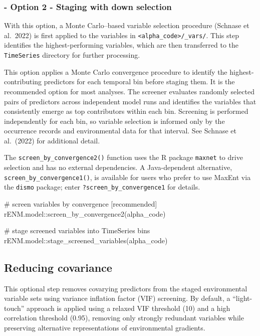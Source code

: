 \documentclass[
  letterpaper,
  DIV=11,
  numbers=noendperiod]{scrartcl}
\newenvironment{Shaded}{\begin{snugshade}}{\end{snugshade}}
\newcommand{\CommentTok}[1]{\textcolor[rgb]{0.37,0.37,0.37}{#1}}
\newcommand{\FunctionTok}[1]{\textcolor[rgb]{0.28,0.35,0.67}{#1}}
\newcommand{\NormalTok}[1]{\textcolor[rgb]{0.00,0.23,0.31}{#1}}
\newcommand{\SpecialCharTok}[1]{\textcolor[rgb]{0.37,0.37,0.37}{#1}}
\begin{document}
\subsubsection{- Option 2 - Staging with down
selection}\label{option-2---staging-with-down-selection}

With this option, a Monte Carlo--based variable selection procedure
(Schnase et al.~2022) is first applied to the variables in
\texttt{\textless{}alpha\_code\textgreater{}/\_vars/}. This step
identifies the highest-performing variables, which are then transferred
to the \texttt{TimeSeries} directory for further processing.

This option applies a Monte Carlo convergence procedure to identify the
highest-contributing predictors for each temporal bin before staging
them. It is the recommended option for most analyses. The screener
evaluates randomly selected pairs of predictors across independent model
runs and identifies the variables that consistently emerge as top
contributors within each bin. Screening is performed independently for
each bin, so variable selection is informed only by the occurrence
records and environmental data for that interval. See Schnase et
al.~(2022) for additional detail.

The \texttt{screen\_by\_convergence2()} function uses the R package
\texttt{maxnet} to drive selection and has no external dependencies. A
Java-dependent alternative, \texttt{screen\_by\_convergence1()}, is
available for users who prefer to use MaxEnt via the \texttt{dismo}
package; enter \texttt{?screen\_by\_convergence1} for details.

\begin{Shaded}
\begin{Highlighting}[]
\CommentTok{\# screen variables by convergence [recommended]}
\NormalTok{rENM.model}\SpecialCharTok{::}\FunctionTok{screen\_by\_convergence2}\NormalTok{(alpha\_code)}

\CommentTok{\# stage screened variables into TimeSeries bins}
\NormalTok{rENM.model}\SpecialCharTok{::}\FunctionTok{stage\_screened\_variables}\NormalTok{(alpha\_code)}
\end{Highlighting}
\end{Shaded}

\subsection{Reducing covariance}\label{reducing-covariance}

This optional step removes covarying predictors from the staged
environmental variable sets using variance inflation factor (VIF)
screening. By default, a ``light-touch'' approach is applied using a
relaxed VIF threshold (10) and a high correlation threshold (0.95),
removing only strongly redundant variables while preserving alternative
representations of environmental gradients.
\end{document}

